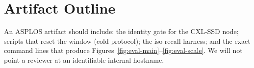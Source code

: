 \section{Artifact Outline}
\label{app:artifact}

An ASPLOS artifact should include: the identity gate for the CXL-SSD node; scripts that reset the window (cold protocol); the iso-recall harness; and the exact command lines that produce Figures~\ref{fig:eval-main}--\ref{fig:eval-scale}.
We will not point a reviewer at an identifiable internal hostname.
